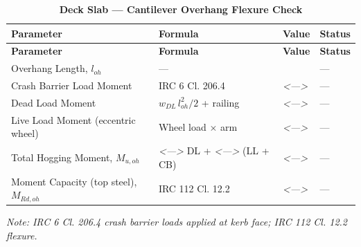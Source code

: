 \documentclass[12pt,a4paper]{report}
\numberwithin{table}{chapter}
\numberwithin{figure}{chapter}
\newcommand{\placeholder}[1]{\textit{\textless #1\textgreater}}
\begin{document}
\vspace{1em}
\begin{longtable}{|L{5.5cm}|C{3.5cm}|>{\centering\arraybackslash}p{4.5cm}|C{2cm}|}
\caption{\textbf{Deck Slab --- Cantilever Overhang Flexure Check}}
\hline
{} \textbf{Parameter} & \textbf{Formula} & \textbf{Value} & \textbf{Status} \\[6pt]
\hline
\endfirsthead
\hline
{} \textbf{Parameter} & \textbf{Formula} & \textbf{Value} & \textbf{Status} \\[6pt]
\hline
\endhead
Overhang Length, $l_{oh}$ & --- &  & --- \\[6pt]
\hline
Crash Barrier Load Moment & IRC 6 Cl. 206.4 & \placeholder{---} & --- \\[6pt]
\hline
Dead Load Moment & $w_{DL}\,l_{oh}^2/2$ + railing & \placeholder{---} & --- \\[6pt]
\hline
Live Load Moment (eccentric wheel) & Wheel load $\times$ arm & \placeholder{---} & --- \\[6pt]
\hline
Total Hogging Moment, $M_{u,oh}$ & \placeholder{---} DL + \placeholder{---} (LL + CB) & \placeholder{---} & --- \\[6pt]
\hline
Moment Capacity (top steel), $M_{Rd,oh}$ & IRC 112 Cl. 12.2 & \placeholder{---} & --- \\[6pt]
\hline
\end{longtable}
\noindent\textit{Note: IRC 6 Cl. 206.4 crash barrier loads applied at kerb face; IRC 112 Cl. 12.2 flexure.}
\end{document}
